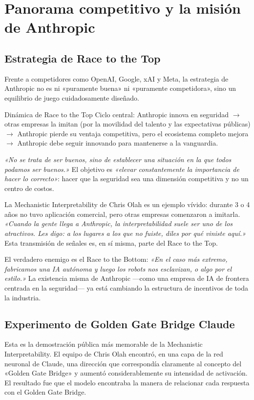 \section{Panorama competitivo y la misión de Anthropic}

\subsection{Estrategia de Race to the Top}

Frente a competidores como OpenAI, Google, xAI y Meta, la estrategia de Anthropic no es ni «puramente buena» ni «puramente competidora», sino un equilibrio de juego cuidadosamente diseñado.

\begin{importantbox}{Dinámica de Race to the Top}
Ciclo central: Anthropic innova en seguridad $\to$ otras empresas la imitan (por la movilidad del talento y las expectativas públicas) $\to$ Anthropic pierde su ventaja competitiva, pero el ecosistema completo mejora $\to$ Anthropic debe seguir innovando para mantenerse a la vanguardia.

\textit{«No se trata de ser buenos, sino de establecer una situación en la que todos podamos ser buenos.»} El objetivo es \textit{«elevar constantemente la importancia de hacer lo correcto»}: hacer que la seguridad sea una dimensión competitiva y no un centro de costos.

La Mechanistic Interpretability de Chris Olah es un ejemplo vívido: durante 3 o 4 años no tuvo aplicación comercial, pero otras empresas comenzaron a imitarla. \textit{«Cuando la gente llega a Anthropic, la interpretabilidad suele ser uno de los atractivos. Les digo: a los lugares a los que no fuiste, diles por qué viniste aquí.»} Esta transmisión de señales es, en sí misma, parte del Race to the Top.
\end{importantbox}

El verdadero enemigo es el Race to the Bottom: \textit{«En el caso más extremo, fabricamos una IA autónoma y luego los robots nos esclavizan, o algo por el estilo.»} La existencia misma de Anthropic —como una empresa de IA de frontera centrada en la seguridad— ya está cambiando la estructura de incentivos de toda la industria.

\subsection{Experimento de Golden Gate Bridge Claude}

Esta es la demostración pública más memorable de la Mechanistic Interpretability. El equipo de Chris Olah encontró, en una capa de la red neuronal de Claude, una dirección que correspondía claramente al concepto del «Golden Gate Bridge» y aumentó considerablemente su intensidad de activación. El resultado fue que el modelo encontraba la manera de relacionar cada respuesta con el Golden Gate Bridge.


